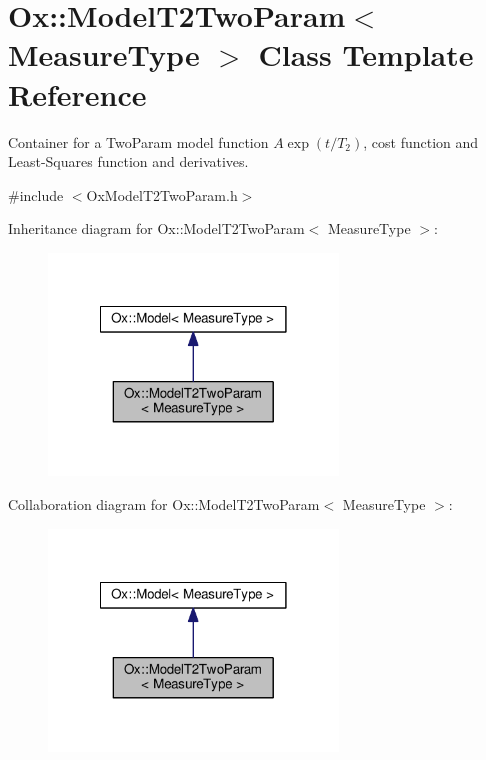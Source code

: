 \hypertarget{class_ox_1_1_model_t2_two_param}{\section{Ox\-:\-:Model\-T2\-Two\-Param$<$ Measure\-Type $>$ Class Template Reference}
\label{class_ox_1_1_model_t2_two_param}
}


Container for a Two\-Param model function $ A\exp(t/T_2) $, cost function and Least-\/\-Squares function and derivatives.  




{\ttfamily \#include $<$Ox\-Model\-T2\-Two\-Param.\-h$>$}



Inheritance diagram for Ox\-:\-:Model\-T2\-Two\-Param$<$ Measure\-Type $>$\-:
\nopagebreak
\begin{figure}[H]
\begin{center}
\leavevmode
\includegraphics[width=218pt]{class_ox_1_1_model_t2_two_param__inherit__graph}
\end{center}
\end{figure}


Collaboration diagram for Ox\-:\-:Model\-T2\-Two\-Param$<$ Measure\-Type $>$\-:
\nopagebreak
\begin{figure}[H]
\begin{center}
\leavevmode
\includegraphics[width=218pt]{class_ox_1_1_model_t2_two_param__coll__graph}
\end{center}
\end{figure}
